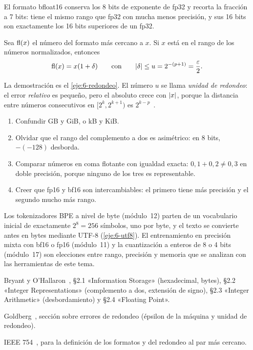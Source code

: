 El formato bfloat16 conserva los 8 bits de exponente de fp32 y recorta la fracción a 7 bits: tiene el mismo rango que fp32 con mucha menos precisión, y sus 16 bits son exactamente los 16 bits superiores de un fp32.

\begin{proposicion}\label{prop:redondeo}
Sea $\operatorname{fl}(x)$ el número del formato más cercano a $x$. Si $x$ está en el rango de los números normalizados, entonces
\[
\operatorname{fl}(x)=x(1+\delta)\qquad\text{con}\qquad\lvert\delta\rvert\le u=2^{-(p+1)}=\frac\varepsilon2.
\]
\end{proposicion}

La demostración es el \cref{eje:6-redondeo}. El número $u$ se llama \emph{unidad de redondeo}: el error \emph{relativo} es pequeño, pero el absoluto crece con $\lvert x\rvert$, porque la distancia entre números consecutivos en $[2^k,2^{k+1})$ es $2^{k-p}$~\cite{goldberg}.

\begin{observacion}
\begin{enumerate}[label=(\alph*)]
\item Confundir GB y GiB, o kB y KiB.
\item Olvidar que el rango del complemento a dos es asimétrico: en 8 bits, $-(-128)$ desborda.
\item Comparar números en coma flotante con igualdad exacta: $0{,}1+0{,}2\neq0{,}3$ en doble precisión, porque ninguno de los tres es representable.
\item Creer que fp16 y bf16 son intercambiables: el primero tiene más precisión y el segundo mucho más rango.
\end{enumerate}
\end{observacion}

\begin{observacion}
Los tokenizadores BPE a nivel de byte (módulo~12) parten de un vocabulario inicial de exactamente $2^8=256$ símbolos, uno por byte, y el texto se convierte antes en bytes mediante UTF-8 (\cref{eje:6-utf8}). El entrenamiento en precisión mixta con bf16 o fp16 (módulo~11) y la cuantización a enteros de 8 o 4 bits (módulo~17) son elecciones entre rango, precisión y memoria que se analizan con las herramientas de este tema.
\end{observacion}

\begin{lecturas}
\item Bryant y O'Hallaron~\cite{csapp}, §2.1 «Information Storage» (hexadecimal, bytes), §2.2 «Integer Representations» (complemento a dos, extensión de signo), §2.3 «Integer Arithmetic» (desbordamiento) y §2.4 «Floating Point».
\item Goldberg~\cite{goldberg}, sección sobre errores de redondeo (épsilon de la máquina y unidad de redondeo).
\item IEEE 754~\cite{ieee754}, para la definición de los formatos y del redondeo al par más cercano.
\end{lecturas}

